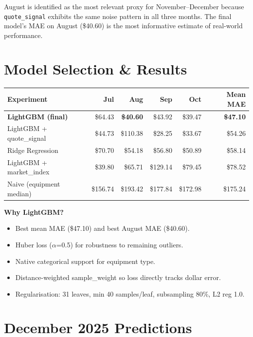 \documentclass[11pt,a4paper]{article}
\begin{document}
August is identified as the most relevant proxy for November--December because \texttt{quote\_signal}
exhibits the same noise pattern in all three months. The final model's MAE on August (\$40.60)
is the most informative estimate of real-world performance.

\section{Model Selection \& Results}

\begin{table}[h]
\centering
\begin{tabular}{lrrrrr}
\toprule
\textbf{Experiment} & \textbf{Jul} & \textbf{Aug} & \textbf{Sep} & \textbf{Oct} & \textbf{Mean MAE} \\
\midrule
\textbf{LightGBM (final)} & \$64.43 & \textbf{\$40.60} & \$43.92 & \$39.47 & \textbf{\$47.10} \\
LightGBM + quote\_signal   & \$44.73 & \$110.38         & \$28.25 & \$33.67 & \$54.26 \\
Ridge Regression           & \$70.70 & \$54.18          & \$56.80 & \$50.89 & \$58.14 \\
LightGBM + market\_index   & \$39.80 & \$65.71          & \$129.14& \$79.45 & \$78.52 \\
Naive (equipment median)   & \$156.74& \$193.42         & \$177.84& \$172.98& \$175.24 \\
\bottomrule
\end{tabular}
\end{table}

\textbf{Why LightGBM?}
\begin{itemize}[leftmargin=1.5em]
  \item Best mean MAE (\$47.10) and best August MAE (\$40.60).
  \item Huber loss ($\alpha$=0.5) for robustness to remaining outliers.
  \item Native categorical support for equipment type.
  \item Distance-weighted sample\_weight so loss directly tracks dollar error.
  \item Regularisation: 31 leaves, min 40 samples/leaf, subsampling 80\%, L2 reg 1.0.
\end{itemize}

\section{December 2025 Predictions}
\end{document}
